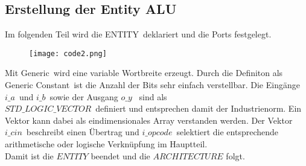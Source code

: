 \documentclass[12pt,a4paper]{scrartcl}	%
\begin{document}
\subsection{Erstellung der Entity \glqq ALU\grqq}
Im folgenden Teil wird die \glqq ENTITY\grqq~deklariert und die Ports festgelegt. 
\begin{figure}[htb]
	
	\texttt{[image: code2.png]}
\end{figure}
Mit \glqq Generic\grqq~wird eine variable Wortbreite erzeugt. Durch die Definiton als \glqq Generic Constant\grqq~ist die Anzahl der Bits sehr einfach verstellbar. Die Eingänge $i\_a$~und $i\_b$~sowie der Ausgang $o\_y$~ sind als\\ $STD\_LOGIC\_VECTOR$~definiert und entsprechen damit der Industrienorm. Ein Vektor kann dabei als eindimensionales Array verstanden werden. Der Vektor $i\_cin$~beschreibt einen Übertrag und $i\_opcode$~selektiert die entsprechende arithmetische oder logische Verknüpfung im Hauptteil.\\
Damit ist die $ENTITY$ beendet und die $ARCHITECTURE$ folgt.
\end{document}

